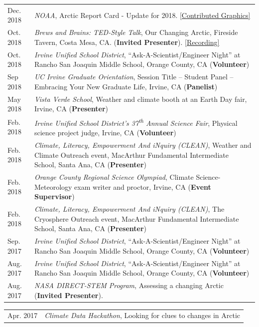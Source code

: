 \documentclass[margin,line,palatino,courier,10pt]{res}
\begin{document}
\begin{resume}
\begin{tabular}{@{}p{0.9in}p{4in}}
Dec. 2018 & \textit{NOAA}, Arctic Report Card - Update for 2018. \href{https://www.youtube.com/watch?v=XntO9a-NpeM}{[Contributed Graphics]}\\
Oct. 2018 & \textit{Brews and Brains: TED-Style Talk}, Our Changing Arctic, Fireside Tavern, Costa Mesa, CA. (\textbf{Invited Presenter}). \href{https://www.youtube.com/watch?v=A5qQpDtOdvg}{[Recording]}\\
Oct. 2018 & \textit{Irvine Unified School District}, ``Ask-A-Scientist/Engineer Night'' at Rancho San Joaquin Middle School, Orange County, CA (\textbf{Volunteer})\\
Sep 2018 & \textit{UC Irvine Graduate Orientation}, Session Title -- Student Panel -- Embracing Your New Graduate Life, Irvine, CA (\textbf{Panelist})\\
May 2018 & \textit{Vista Verde School}, Weather and climate booth at an Earth Day fair, Irvine, CA (\textbf{Presenter})\\
Feb. 2018 & \textit{Irvine Unified School District's 37\textsuperscript{th} Annual Science Fair}, Physical science project judge, Irvine, CA (\textbf{Volunteer})\\
Feb. 2018 & \textit{Climate, Literacy, Empowerment And iNquiry (CLEAN)}, Weather and Climate Outreach event, MacArthur Fundamental Intermediate School, Santa Ana, CA (\textbf{Presenter})\\
Feb. 2018 & \textit{Orange County Regional Science Olympiad}, Climate Science-Meteorology exam writer and proctor, Irvine, CA (\textbf{Event Supervisor})\\
Feb. 2018 & \textit{Climate, Literacy, Empowerment And iNquiry (CLEAN)}, The Cryosphere Outreach event, MacArthur Fundamental Intermediate School, Santa Ana, CA (\textbf{Presenter})\\
Sep. 2017 & \textit{Irvine Unified School District}, ``Ask-A-Scientist/Engineer Night'' at Rancho San Joaquin Middle School, Orange County, CA (\textbf{Volunteer})\\
Aug. 2017 & \textit{Irvine Unified School District}, ``Ask-A-Scientist/Engineer Night'' at Rancho San Joaquin Middle School, Orange County, CA (\textbf{Volunteer})\\
Aug. 2017 & \textit{NASA DIRECT-STEM Program}, Assessing a changing Arctic (\textbf{Invited Presenter}).\\
\end{tabular}
\begin{tabular}{@{}p{0.9in}p{4in}}
Apr. 2017 & \textit{Climate Data Hackathon}, Looking for clues to changes in Arctic 

\end{tabular}
\end{resume}
\end{document}
